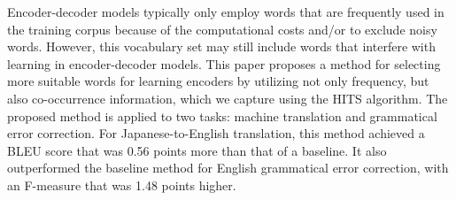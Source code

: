 Encoder-decoder models typically only employ words that are frequently used in the training corpus because of the computational costs and/or to exclude noisy words. However, this vocabulary set may still include words that interfere with learning in encoder-decoder models. This paper proposes a method for selecting more suitable words for learning encoders by utilizing not only frequency, but also co-occurrence information, which we capture using the HITS algorithm. The proposed method is applied to two tasks: machine translation and grammatical error correction. For Japanese-to-English translation, this method achieved a BLEU score that was 0.56 points more than that of a baseline. It also outperformed the baseline method for English grammatical error correction, with an F-measure that was 1.48 points higher.
